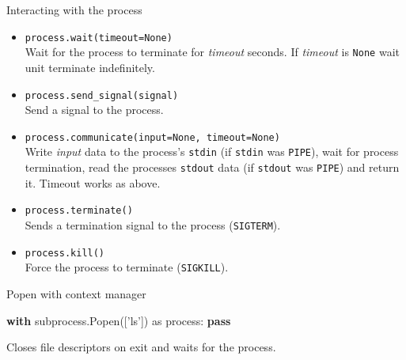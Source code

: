 \documentclass[ignorenonframetext,]{beamer}
\newenvironment{Shaded}{}{}
\newcommand{\StringTok}[1]{\textcolor[rgb]{0.25,0.44,0.63}{{#1}}}
\newcommand{\ImportTok}[1]{{#1}}
\newcommand{\ControlFlowTok}[1]{\textcolor[rgb]{0.00,0.44,0.13}{\textbf{{#1}}}}
\newcommand{\NormalTok}[1]{{#1}}
\providecommand{\tightlist}{%
  \setlength{\itemsep}{0pt}\setlength{\parskip}{0pt}}
\begin{document}
\begin{frame}{Interacting with the process}

\begin{itemize}
\item
  \texttt{process.wait(timeout=None)}\\
  Wait for the process to terminate for \emph{timeout} seconds. If
  \emph{timeout} is \texttt{None} wait unit terminate indefinitely.
\item
  \texttt{process.send\_signal(signal)}\\
  Send a signal to the process.
\end{itemize}

\end{frame}

\begin{frame}

\begin{itemize}
\tightlist
\item
  \texttt{process.communicate(input=None,\ timeout=None)}\\
  Write \emph{input} data to the process's \texttt{stdin} (if
  \texttt{stdin} was \texttt{PIPE}), wait for process termination, read
  the processes \texttt{stdout} data (if \texttt{stdout} was
  \texttt{PIPE}) and return it. Timeout works as above.
\end{itemize}

\end{frame}

\begin{frame}

\begin{itemize}
\item
  \texttt{process.terminate()}\\
  Sends a termination signal to the process (\texttt{SIGTERM}).
\item
  \texttt{process.kill()}\\
  Force the process to terminate (\texttt{SIGKILL}).
\end{itemize}

\end{frame}

\begin{frame}[fragile]{Popen with context manager}

\begin{Shaded}
\begin{Highlighting}[]
\ControlFlowTok{with} \NormalTok{subprocess.Popen([}\StringTok{'ls'}\NormalTok{]) }\ImportTok{as} \NormalTok{process:}
    \ControlFlowTok{pass}
\end{Highlighting}
\end{Shaded}

Closes file descriptors on exit and waits for the process.

\end{frame}
\end{document}
